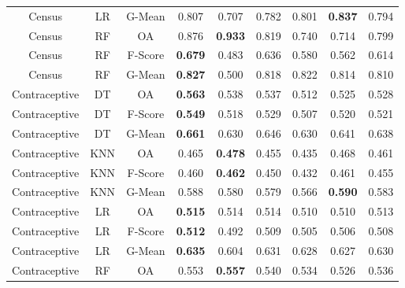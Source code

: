 \begin{longtable}{ccccccccc}
            Census &         LR &  G-Mean &          0.807 &          0.707 &          0.782 &          0.801 & \textbf{0.837} &          0.794 \\
            Census &         RF &      OA &          0.876 & \textbf{0.933} &          0.819 &          0.740 &          0.714 &          0.799 \\
            Census &         RF & F-Score & \textbf{0.679} &          0.483 &          0.636 &          0.580 &          0.562 &          0.614 \\
            Census &         RF &  G-Mean & \textbf{0.827} &          0.500 &          0.818 &          0.822 &          0.814 &          0.810 \\
     Contraceptive &         DT &      OA & \textbf{0.563} &          0.538 &          0.537 &          0.512 &          0.525 &          0.528 \\
     Contraceptive &         DT & F-Score & \textbf{0.549} &          0.518 &          0.529 &          0.507 &          0.520 &          0.521 \\
     Contraceptive &         DT &  G-Mean & \textbf{0.661} &          0.630 &          0.646 &          0.630 &          0.641 &          0.638 \\
     Contraceptive &        KNN &      OA &          0.465 & \textbf{0.478} &          0.455 &          0.435 &          0.468 &          0.461 \\
     Contraceptive &        KNN & F-Score &          0.460 & \textbf{0.462} &          0.450 &          0.432 &          0.461 &          0.455 \\
     Contraceptive &        KNN &  G-Mean &          0.588 &          0.580 &          0.579 &          0.566 & \textbf{0.590} &          0.583 \\
     Contraceptive &         LR &      OA & \textbf{0.515} &          0.514 &          0.514 &          0.510 &          0.510 &          0.513 \\
     Contraceptive &         LR & F-Score & \textbf{0.512} &          0.492 &          0.509 &          0.505 &          0.506 &          0.508 \\
     Contraceptive &         LR &  G-Mean & \textbf{0.635} &          0.604 &          0.631 &          0.628 &          0.627 &          0.630 \\
     Contraceptive &         RF &      OA &          0.553 & \textbf{0.557} &          0.540 &          0.534 &          0.526 &          0.536 \\

\end{longtable}

